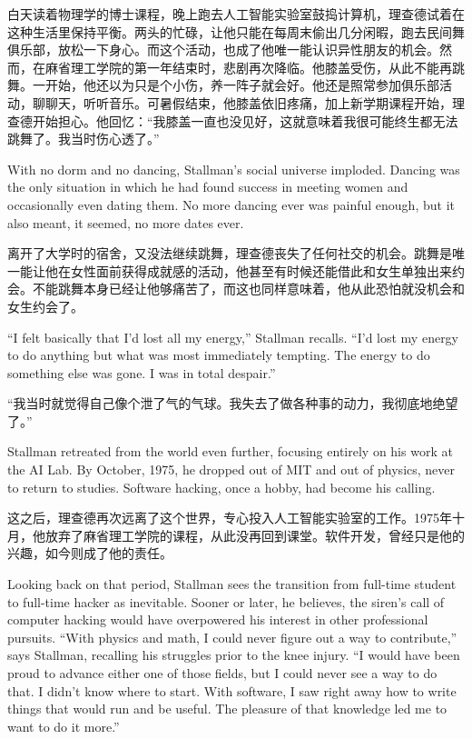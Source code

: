 \ifdefined\chs
白天读着物理学的博士课程，晚上跑去人工智能实验室鼓捣计算机，理查德试着在这种生活里保持平衡。两头的忙碌，让他只能在每周末偷出几分闲暇，跑去民间舞俱乐部，放松一下身心。而这个活动，也成了他唯一能认识异性朋友的机会。然而，在麻省理工学院的第一年结束时，悲剧再次降临。他膝盖受伤，从此不能再跳舞。一开始，他还以为只是个小伤，养一阵子就会好。他还是照常参加俱乐部活动，聊聊天，听听音乐。可暑假结束，他膝盖依旧疼痛，加上新学期课程开始，理查德开始担心。他回忆：“我膝盖一直也没见好，这就意味着我很可能终生都无法跳舞了。我当时伤心透了。”
\fi

\ifdefined\eng
With no dorm and no dancing, Stallman's social universe imploded. Dancing was the only situation in which he had found success in meeting women and occasionally even dating them. No more dancing ever was painful enough, but it also meant, it seemed, no more dates ever.
\fi

\ifdefined\chs
离开了大学时的宿舍，又没法继续跳舞，理查德丧失了任何社交的机会。跳舞是唯一能让他在女性面前获得成就感的活动，他甚至有时候还能借此和女生单独出来约会。不能跳舞本身已经让他够痛苦了，而这也同样意味着，他从此恐怕就没机会和女生约会了。
\fi

\ifdefined\eng
``I felt basically that I'd lost all my energy,'' Stallman recalls. ``I'd lost my energy to do anything but what was most immediately tempting. The energy to do something else was gone. I was in total despair.''
\fi

\ifdefined\chs
“我当时就觉得自己像个泄了气的气球。我失去了做各种事的动力，我彻底地绝望了。”
\fi

\ifdefined\eng
Stallman retreated from the world even further, focusing entirely on his work at the AI Lab. By October, 1975, he dropped out of MIT and out of physics, never to return to studies. Software hacking, once a hobby, had become his calling.
\fi

\ifdefined\chs
这之后，理查德再次远离了这个世界，专心投入人工智能实验室的工作。1975年十月，他放弃了麻省理工学院的课程，从此没再回到课堂。软件开发，曾经只是他的兴趣，如今则成了他的责任。
\fi

\ifdefined\eng
Looking back on that period, Stallman sees the transition from full-time student to full-time hacker as inevitable. Sooner or later, he believes, the siren's call of computer hacking would have overpowered his interest in other professional pursuits. ``With physics and math, I could never figure out a way to contribute,'' says Stallman, recalling his struggles prior to the knee injury. ``I would have been proud to advance either one of those fields, but I could never see a way to do that. I didn't know where to start. With software, I saw right away how to write things that would run and be useful. The pleasure of that knowledge led me to want to do it more.''
\fi

